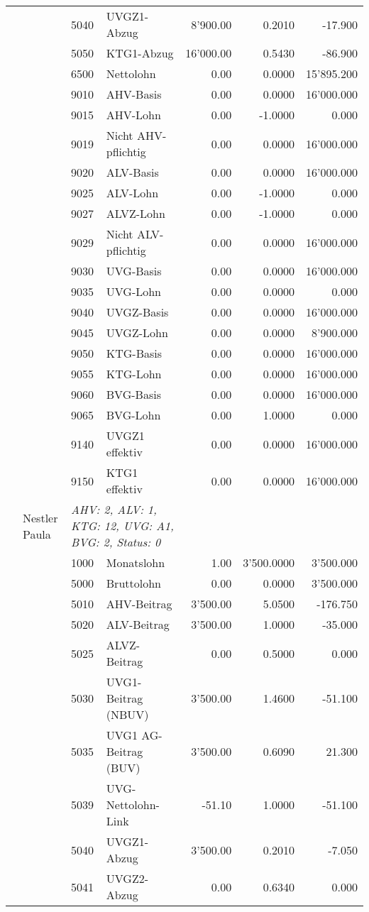 \documentclass[15pt,a4paper]{article}
\begin{document}
\begin{longtable}{@{\extracolsep{\fill}}l l l l|r|r|r}
&&5040&UVGZ1-Abzug&8'900.00&0.2010&-17.900\\
&&5050&KTG1-Abzug&16'000.00&0.5430&-86.900\\
&&6500&Nettolohn&0.00&0.0000&15'895.200\\
&&9010&AHV-Basis&0.00&0.0000&16'000.000\\
&&9015&AHV-Lohn&0.00&-1.0000&0.000\\
&&9019&Nicht AHV-pflichtig&0.00&0.0000&16'000.000\\
&&9020&ALV-Basis&0.00&0.0000&16'000.000\\
&&9025&ALV-Lohn&0.00&-1.0000&0.000\\
&&9027&ALVZ-Lohn&0.00&-1.0000&0.000\\
&&9029&Nicht ALV-pflichtig&0.00&0.0000&16'000.000\\
&&9030&UVG-Basis&0.00&0.0000&16'000.000\\
&&9035&UVG-Lohn&0.00&0.0000&0.000\\
&&9040&UVGZ-Basis&0.00&0.0000&16'000.000\\
&&9045&UVGZ-Lohn&0.00&0.0000&8'900.000\\
&&9050&KTG-Basis&0.00&0.0000&16'000.000\\
&&9055&KTG-Lohn&0.00&0.0000&16'000.000\\
&&9060&BVG-Basis&0.00&0.0000&16'000.000\\
&&9065&BVG-Lohn&0.00&1.0000&0.000\\
&&9140&UVGZ1 effektiv&0.00&0.0000&16'000.000\\
&&9150&KTG1 effektiv&0.00&0.0000&16'000.000\\
\pagebreak
17&Nestler Paula&\multicolumn{2}{l|}{\small\emph{AHV: 2, ALV: 1, KTG: 12, UVG: A1, BVG: 2, Status: 0}}&& \\
&&1000&Monatslohn&1.00&3'500.0000&3'500.000\\
&&5000&Bruttolohn&0.00&0.0000&3'500.000\\
&&5010&AHV-Beitrag&3'500.00&5.0500&-176.750\\
&&5020&ALV-Beitrag&3'500.00&1.0000&-35.000\\
&&5025&ALVZ-Beitrag&0.00&0.5000&0.000\\
&&5030&UVG1-Beitrag (NBUV)&3'500.00&1.4600&-51.100\\
&&5035&UVG1 AG-Beitrag (BUV)&3'500.00&0.6090&21.300\\
&&5039&UVG-Nettolohn-Link&-51.10&1.0000&-51.100\\
&&5040&UVGZ1-Abzug&3'500.00&0.2010&-7.050\\
&&5041&UVGZ2-Abzug&0.00&0.6340&0.000\\

\end{longtable}
\end{document}
